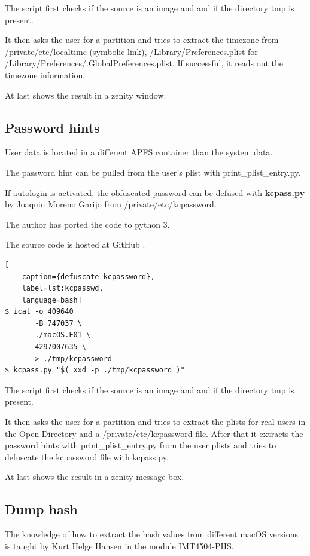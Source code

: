 \noindent The script first checks if the source is an image and and if the directory tmp is present.

It then asks the user for a partition and tries to extract the timezone from /private/etc/localtime (symbolic link), /Library/Preferences.plist for /Library/Preferences/.GlobalPreferences.plist. If successful, it reads out the timezone information.

At last shows the result in a zenity window.

\subsection{Password hints}

User data is located in a different APFS container than the system data.

The password hint can be pulled from the user's plist with print\_plist\_entry.py.

If autologin is activated, the obfuscated password can be defused with \textbf{kcpass.py} by Joaquin Moreno Garijo from /private/etc/kcpassword.

The author has ported the code to python 3.

The source code is hosted at GitHub \cite{Kcpass}.

\begin{lstlisting}[
    caption={defuscate kcpassword},
    label=lst:kcpasswd,
    language=bash]
$ icat -o 409640 
       -B 747037 \
       ./macOS.E01 \
       4297007635 \
       > ./tmp/kcpassword
$ kcpass.py "$( xxd -p ./tmp/kcpassword )"
\end{lstlisting}

\noindent The script first checks if the source is an image and and if the directory tmp is present.

It then asks the user for a partition and tries to extract the plists for real users in the Open Directory and a /private/etc/kcpassword file. After that it extracts the password hints with print\_plist\_entry.py from the user plists and tries to defuscate the kcpassword file with kcpass.py.

At last shows the result in a zenity message box.

\subsection{Dump hash}

The knowledge of how to extract the hash values from different macOS versions is taught by Kurt Helge Hansen in the module IMT4504-PHS.

